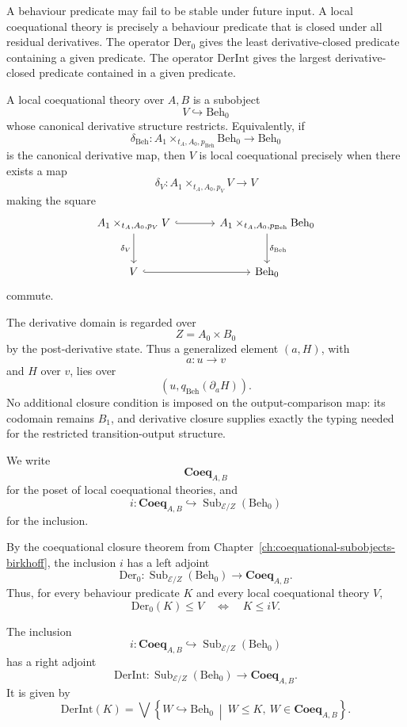 A behaviour predicate may fail to be stable under future input.  A local
coequational theory is precisely a behaviour predicate that is closed under
all residual derivatives.  The operator \(\mathrm{Der}_0\) gives the least
derivative-closed predicate containing a given predicate.  The operator
\(\mathrm{DerInt}\) gives the largest derivative-closed predicate contained
in a given predicate.

A local coequational theory over \(A,B\) is a subobject
\[
  V\hookrightarrow \mathrm{Beh}_0
\]
whose canonical derivative structure restricts.  Equivalently, if
\[
  \delta_{\mathrm{Beh}}:
  A_1\times_{t_A,A_0,p_{\mathrm{Beh}}}
  \mathrm{Beh}_0
  \longrightarrow
  \mathrm{Beh}_0
\]
is the canonical derivative map, then \(V\) is local coequational precisely
when there exists a map
\[
  \delta_V:
  A_1\times_{t_A,A_0,p_V}V
  \longrightarrow
  V
\]
making the square
\[
\begin{tikzcd}[column sep=large,row sep=large]
A_1\times_{t_A,A_0,p_V}V
  \arrow[r, hook]
  \arrow[d, "\delta_V"']
&
A_1\times_{t_A,A_0,p_{\mathrm{Beh}}}\mathrm{Beh}_0
  \arrow[d, "\delta_{\mathrm{Beh}}"]
\\
V
  \arrow[r, hook]
&
\mathrm{Beh}_0
\end{tikzcd}
\]
commute.

The derivative domain is regarded over
\[
  Z=A_0\times B_0
\]
by the post-derivative state.  Thus a generalized element \((a,H)\), with
\[
  a:u\to v
\]
and \(H\) over \(v\), lies over
\[
  (u,q_{\mathrm{Beh}}(\partial_aH)).
\]
No additional closure condition is imposed on the output-comparison map: its
codomain remains \(B_1\), and derivative closure supplies exactly the typing
needed for the restricted transition-output structure.

We write
\[
  \mathbf{Coeq}_{A,B}
\]
for the poset of local coequational theories, and
\[
  i:\mathbf{Coeq}_{A,B}
  \hookrightarrow
  \operatorname{Sub}_{\mathcal E/Z}(\mathrm{Beh}_0)
\]
for the inclusion.

By the coequational closure theorem from
Chapter~\ref{ch:coequational-subobjects-birkhoff}, the inclusion \(i\) has
a left adjoint
\[
  \mathrm{Der}_0
  :
  \operatorname{Sub}_{\mathcal E/Z}(\mathrm{Beh}_0)
  \longrightarrow
  \mathbf{Coeq}_{A,B}.
\]
Thus, for every behaviour predicate \(K\) and every local coequational theory
\(V\),
\[
  \mathrm{Der}_0(K)\leq V
  \quad\Longleftrightarrow\quad
  K\leq iV.
\]

\begin{lemma}
\label{lem:derivative-interior}
The inclusion
\[
  i:\mathbf{Coeq}_{A,B}
  \hookrightarrow
  \operatorname{Sub}_{\mathcal E/Z}(\mathrm{Beh}_0)
\]
has a right adjoint
\[
  \mathrm{DerInt}:
  \operatorname{Sub}_{\mathcal E/Z}(\mathrm{Beh}_0)
  \longrightarrow
  \mathbf{Coeq}_{A,B}.
\]
It is given by
\[
  \mathrm{DerInt}(K)
  =
  \bigvee
  \left\{
    W\hookrightarrow \mathrm{Beh}_0
    \ \middle|\
    W\leq K,\ W\in\mathbf{Coeq}_{A,B}
  \right\}.
\]
\end{lemma}

